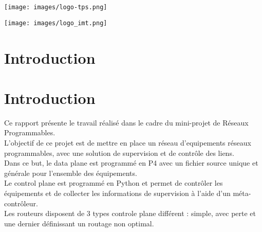 \documentclass[12pt,a4paper]{report}
\newcommand*\sectiontitle{}
\let\origsection\section
\renewcommand*{\section}[2][]{%
\ifx\setminus#1\setminus%
  \origsection{#2}%
  \renewcommand*\sectiontitle{#2}%
\else
  \origsection[#1]{#2}%
  \renewcommand*\sectiontitle{#1}%
\fi
}
\begin{document}
\begin{titlepage}
    \vspace{1.5cm} %

    \begin{center}
        \begin{minipage}{0.45\textwidth}
            \texttt{[image: images/logo-tps.png]}
        \end{minipage}
        \hfill
        \begin{minipage}{0.45\textwidth}
            \texttt{[image: images/logo\_imt.png]}
        \end{minipage}
    \end{center}
    
    \vspace{1.5cm} %

    
    \vfill %
    
\end{titlepage}

\thispagestyle{tocstyle}



\tableofcontents %
\clearpage %

\pagestyle{plain} %


\section{Introduction}

    \begin{card}
    Ce rapport présente le travail réalisé dans le cadre du mini-projet de Réseaux Programmables. \\
    L'objectif de ce projet est de mettre en place un réseau d'equipements réseaux programmables, avec une solution de supervision et de contrôle des liens. \\
    Dans ce but, le data plane est programmé en P4 avec un fichier source unique et générale pour l'ensemble des équipements. \\
    Le control plane est programmé en Python et permet de contrôler les équipements et de collecter les informations de supervision à l'aide d'un méta-contrôleur. \\
    Les routeurs disposent de 3 types controle plane différent : simple, avec perte et  une dernier définissant un routage non optimal. \\
    \end{card}
\end{document}
